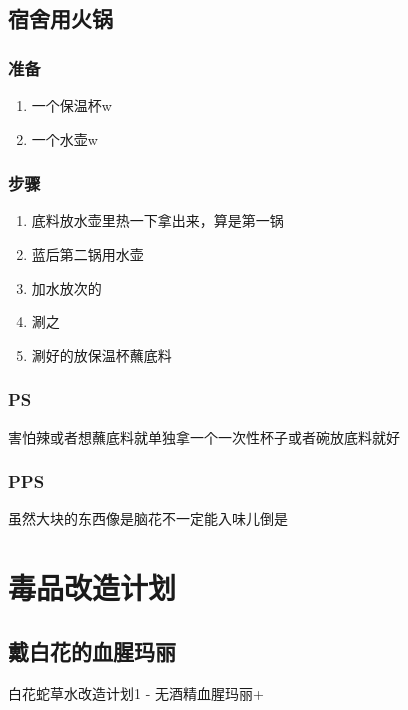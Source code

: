 \documentclass[12pt, a4paper]{ctexart}
\begin{document}
\subsection{宿舍用火锅}
\subsubsection{准备}
\begin{enumerate}
    \item{一个保温杯w}
    \item{一个水壶w}
\end{enumerate}

\subsubsection{步骤}
\begin{enumerate}
    \item{底料放水壶里热一下拿出来，算是第一锅}
    \item{蓝后第二锅用水壶}
    \item{加水放次的}
    \item{涮之}
    \item{涮好的放保温杯蘸底料}
\end{enumerate}

\subsubsection{PS}
害怕辣或者想蘸底料就单独拿一个一次性杯子或者碗放底料就好

\subsubsection{PPS}
虽然大块的东西像是脑花不一定能入味儿倒是

\newpage
\section{毒品改造计划}

\subsection{戴白花的血腥玛丽}
白花蛇草水改造计划1 - 无酒精血腥玛丽+
\end{document}
